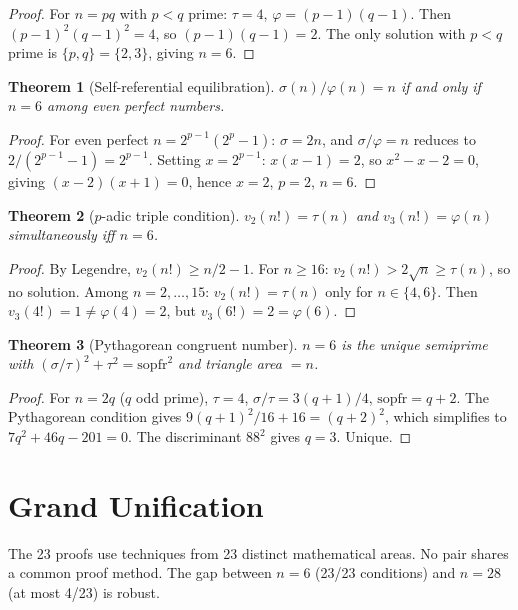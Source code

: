 \documentclass[11pt,a4paper]{article}
\newtheorem{theorem}{Theorem}
\begin{document}
\begin{proof}
For $n=pq$ with $p < q$ prime: $\tau = 4$, $\varphi = (p-1)(q-1)$. Then $(p-1)^2(q-1)^2 = 4$, so $(p-1)(q-1) = 2$. The only solution with $p<q$ prime is $\{p,q\}=\{2,3\}$, giving $n=6$.
\end{proof}

\begin{theorem}[Self-referential equilibration]
$\sigma(n)/\varphi(n) = n$ if and only if $n=6$ among even perfect numbers.
\end{theorem}

\begin{proof}
For even perfect $n = 2^{p-1}(2^p-1)$: $\sigma = 2n$, and $\sigma/\varphi = n$ reduces to $2/(2^{p-1}-1) = 2^{p-1}$. Setting $x = 2^{p-1}$: $x(x-1) = 2$, so $x^2-x-2=0$, giving $(x-2)(x+1)=0$, hence $x=2$, $p=2$, $n=6$.
\end{proof}

\begin{theorem}[$p$-adic triple condition]
$v_2(n!) = \tau(n)$ and $v_3(n!) = \varphi(n)$ simultaneously iff $n=6$.
\end{theorem}

\begin{proof}
By Legendre, $v_2(n!) \ge n/2-1$. For $n \ge 16$: $v_2(n!) > 2\sqrt{n} \ge \tau(n)$, so no solution. Among $n=2,\ldots,15$: $v_2(n!)=\tau(n)$ only for $n \in \{4,6\}$. Then $v_3(4!)=1 \neq \varphi(4)=2$, but $v_3(6!)=2=\varphi(6)$.
\end{proof}

\begin{theorem}[Pythagorean congruent number]
$n=6$ is the unique semiprime with $(\sigma/\tau)^2+\tau^2=\mathrm{sopfr}^2$ and triangle area $=n$.
\end{theorem}

\begin{proof}
For $n=2q$ ($q$ odd prime), $\tau=4$, $\sigma/\tau = 3(q+1)/4$, $\mathrm{sopfr}=q+2$. The Pythagorean condition gives $9(q+1)^2/16 + 16 = (q+2)^2$, which simplifies to $7q^2+46q-201=0$. The discriminant $88^2$ gives $q=3$. Unique.
\end{proof}

\section{Grand Unification}

The 23 proofs use techniques from 23 distinct mathematical areas. No pair shares a common proof method. The gap between $n=6$ (23/23 conditions) and $n=28$ (at most 4/23) is robust.
\end{document}
